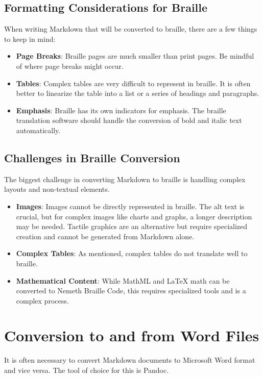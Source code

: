 \subsection{Formatting Considerations for Braille}
\label{subsec:braille-formatting-considerations}
When writing Markdown that will be converted to braille, there are a few things to keep in mind:
\begin{itemize}
	\item \textbf{Page Breaks}: Braille pages are much smaller than print pages. Be mindful of where page breaks might occur.
	\item \textbf{Tables}: Complex tables are very difficult to represent in braille. It is often better to linearize the table into a list or a series of headings and paragraphs.
	\item \textbf{Emphasis}: Braille has its own indicators for emphasis. The braille translation software should handle the conversion of bold and italic text automatically.
\end{itemize}

\subsection{Challenges in Braille Conversion}
\label{subsec:braille-conversion-challenges}
The biggest challenge in converting Markdown to braille is handling complex layouts and non-textual elements.
\begin{itemize}
	\item \textbf{Images}: Images cannot be directly represented in braille. The alt text is crucial, but for complex images like charts and graphs, a longer description may be needed. Tactile graphics are an alternative but require specialized creation and cannot be generated from Markdown alone.
	\item \textbf{Complex Tables}: As mentioned, complex tables do not translate well to braille.
	\item \textbf{Mathematical Content}: While MathML and LaTeX math can be converted to Nemeth Braille Code, this requires specialized tools and is a complex process.
\end{itemize}

\section{Conversion to and from Word Files}
\label{sec:markdown-word-conversion}
It is often necessary to convert Markdown documents to Microsoft Word format and vice versa. The tool of choice for this is Pandoc.

